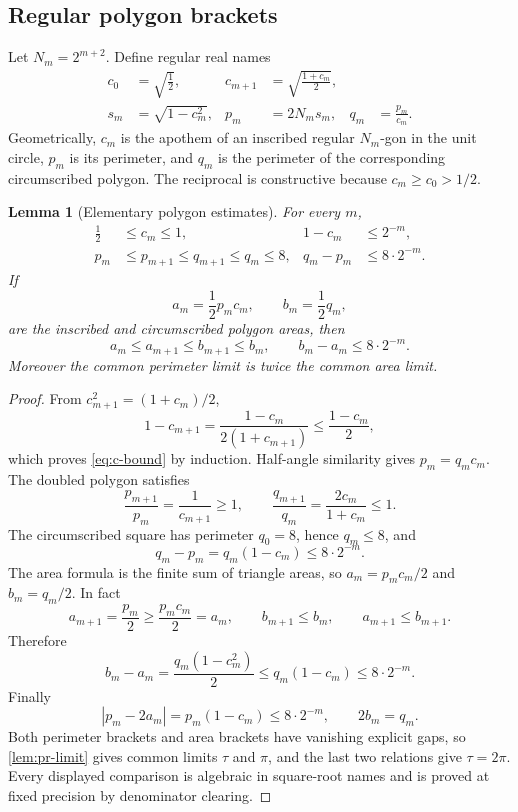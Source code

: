 \documentclass[11pt]{article}
\newtheorem{lemma}[theorem]{Lemma}
\theoremstyle{definition}
\newcommand{\abs}[1]{\left|#1\right|}
\begin{document}
\subsection{Regular polygon brackets}

Let \(N_m=2^{m+2}\).  Define regular real names
\begin{align*}
 c_0&=\sqrt{\tfrac12},
 &c_{m+1}&=\sqrt{\frac{1+c_m}{2}},\\
 s_m&=\sqrt{1-c_m^2},
 &p_m&=2N_ms_m,
 &q_m&=\frac{p_m}{c_m}.
\end{align*}
Geometrically, \(c_m\) is the apothem of an inscribed regular \(N_m\)-gon in
the unit circle, \(p_m\) is its perimeter, and \(q_m\) is the perimeter of
the corresponding circumscribed polygon.  The reciprocal is constructive
because \(c_m\geq c_0>1/2\).

\begin{lemma}[Elementary polygon estimates]
\label{lem:polygon-estimates}
For every \(m\),
\begin{align}
 \tfrac12&\leq c_m\leq1,
 &1-c_m&\leq2^{-m},\label{eq:c-bound}\\
 p_m&\leq p_{m+1}\leq q_{m+1}\leq q_m\leq8,
 &q_m-p_m&\leq8\cdot2^{-m}.
 \label{eq:perim-gap}
\end{align}
If
\[
 a_m=\frac12p_mc_m,
 \qquad
 b_m=\frac12q_m,
\]
are the inscribed and circumscribed polygon areas, then
\begin{equation}
 a_m\leq a_{m+1}\leq b_{m+1}\leq b_m,
 \qquad
 b_m-a_m\leq8\cdot2^{-m}.
 \label{eq:area-gap}
\end{equation}
Moreover the common perimeter limit is twice the common area limit.
\end{lemma}

\begin{proof}
From \(c_{m+1}^2=(1+c_m)/2\),
\[
 1-c_{m+1}
 =\frac{1-c_m}{2(1+c_{m+1})}
 \leq\frac{1-c_m}{2},
\]
which proves \eqref{eq:c-bound} by induction.  Half-angle similarity gives
\(p_m=q_mc_m\).  The doubled polygon satisfies
\[
 \frac{p_{m+1}}{p_m}=\frac1{c_{m+1}}\geq1,
 \qquad
 \frac{q_{m+1}}{q_m}=\frac{2c_m}{1+c_m}\leq1.
\]
The circumscribed square has perimeter \(q_0=8\), hence \(q_m\leq8\), and
\[
 q_m-p_m=q_m(1-c_m)\leq8\cdot2^{-m}.
\]
The area formula is the finite sum of triangle areas, so
\(a_m=p_mc_m/2\) and \(b_m=q_m/2\).  In fact
\[
 a_{m+1}=\frac{p_m}{2}\geq\frac{p_mc_m}{2}=a_m,
 \qquad b_{m+1}\leq b_m,
 \qquad a_{m+1}\leq b_{m+1}.
\]
Therefore
\[
 b_m-a_m=\frac{q_m(1-c_m^2)}2
 \leq q_m(1-c_m)
 \leq8\cdot2^{-m}.
\]
Finally
\[
 \abs{p_m-2a_m}=p_m(1-c_m)\leq8\cdot2^{-m},
 \qquad 2b_m=q_m.
\]
Both perimeter brackets and area brackets have vanishing explicit gaps, so
\cref{lem:pr-limit} gives common limits \(\tau\) and \(\pi\), and the last two
relations give \(\tau=2\pi\).  Every displayed comparison is algebraic in
square-root names and is proved at fixed precision by denominator clearing.
\end{proof}
\end{document}
